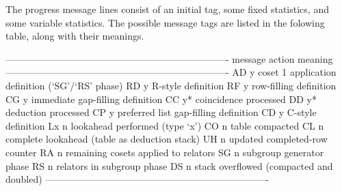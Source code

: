 
The  progress message  lines consist  of  an initial  tag, some  fixed
statistics, and  some variable statistics.  The  possible message tags
are listed in the folowing table, along with their meanings.


\begintt
----------------------------------------------------------------------
message   action      meaning
----------------------------------------------------------------------
AD             y      coset 1 application definition (`SG'/`RS' phase)
RD             y      R-style definition
RF             y      row-filling definition
CG             y      immediate gap-filling definition
CC             y*     coincidence processed
DD             y*     deduction processed
CP             y      preferred list gap-filling definition
CD             y      C-style definition
Lx             n      lookahead performed (type `x')
CO             n      table compacted
CL             n      complete lookahead (table as deduction stack)
UH             n      updated completed-row counter
RA             n      remaining cosets applied to relators
SG             n      subgroup generator phase
RS             n      relators in subgroup phase
DS             n      stack overflowed (compacted and doubled)
----------------------------------------------------------------------
\endtt

